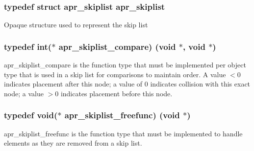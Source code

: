 \subsubsection[{\texorpdfstring{apr\+\_\+skiplist}{apr_skiplist}}]{\setlength{\rightskip}{0pt plus 5cm}typedef struct {\bf apr\+\_\+skiplist} {\bf apr\+\_\+skiplist}}\hypertarget{group__apr__skiplist_gac79ddf14bb5cb5b6d35961309eadec48}{}\label{group__apr__skiplist_gac79ddf14bb5cb5b6d35961309eadec48}
Opaque structure used to represent the skip list 
\subsubsection[{\texorpdfstring{apr\+\_\+skiplist\+\_\+compare}{apr_skiplist_compare}}]{\setlength{\rightskip}{0pt plus 5cm}typedef int($\ast$ apr\+\_\+skiplist\+\_\+compare) (void $\ast$, void $\ast$)}\hypertarget{group__apr__skiplist_ga873aa114e692e48c6587277680ceba87}{}\label{group__apr__skiplist_ga873aa114e692e48c6587277680ceba87}
apr\+\_\+skiplist\+\_\+compare is the function type that must be implemented per object type that is used in a skip list for comparisons to maintain order. A value $<$0 indicates placement after this node; a value of 0 indicates collision with this exact node; a value $>$0 indicates placement before this node. 
\subsubsection[{\texorpdfstring{apr\+\_\+skiplist\+\_\+freefunc}{apr_skiplist_freefunc}}]{\setlength{\rightskip}{0pt plus 5cm}typedef void($\ast$ apr\+\_\+skiplist\+\_\+freefunc) (void $\ast$)}\hypertarget{group__apr__skiplist_ga326fdccaf516e5296969fa03bbda3fca}{}\label{group__apr__skiplist_ga326fdccaf516e5296969fa03bbda3fca}
apr\+\_\+skiplist\+\_\+freefunc is the function type that must be implemented to handle elements as they are removed from a skip list. 
